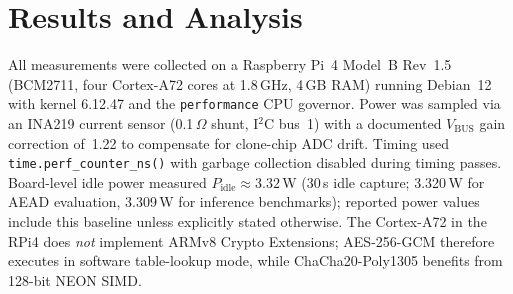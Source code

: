 
\section{Results and Analysis}
\label{sec:results}

All measurements were collected on a Raspberry Pi~4 Model~B Rev~1.5
(BCM2711, four Cortex-A72 cores at 1.8\,GHz, 4\,GB RAM) running Debian~12
with kernel 6.12.47 and the \texttt{performance} CPU governor.  Power was
sampled via an INA219 current sensor (0.1\,$\Omega$ shunt, I$^2$C bus~1) with
a documented $V_\text{BUS}$ gain correction of~1.22 to compensate for clone-chip
ADC drift.  Timing used \texttt{time.perf\_counter\_ns()} with garbage collection
disabled during timing passes.  Board-level idle power measured
$P_\text{idle} \approx 3.32$\,W (30\,s idle capture; 3.320\,W for AEAD
evaluation, 3.309\,W for inference benchmarks);
reported power values include this baseline unless explicitly stated otherwise.
The Cortex-A72 in the RPi4 does \emph{not}
implement ARMv8 Crypto Extensions; AES-256-GCM therefore executes in software
table-lookup mode, while ChaCha20-Poly1305 benefits from 128-bit NEON SIMD.

